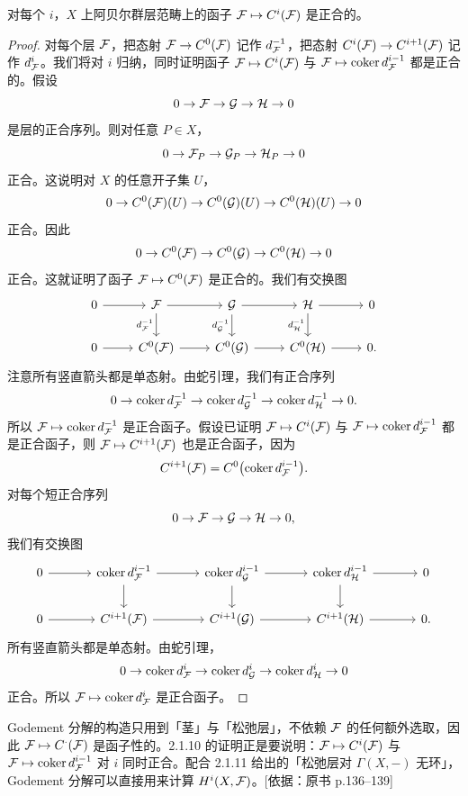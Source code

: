 \begin{proposition}\label{it:2.1.10}
对每个 $i$，$X$ 上阿贝尔群层范畴上的函子 $\mathcal{F}\mapsto C^i(\mathcal{F})$ 是正合的。
\end{proposition}
\begin{proof}
对每个层 $\mathcal{F}$，把态射 $\mathcal{F}\to C^0(\mathcal{F})$ 记作 $d_{\mathcal{F}}^{-1}$，把态射 $C^i(\mathcal{F})\to C^{i+1}(\mathcal{F})$ 记作 $d_{\mathcal{F}}^i$。我们将对 $i$ 归纳，同时证明函子 $\mathcal{F}\mapsto C^i(\mathcal{F})$ 与 $\mathcal{F}\mapsto\operatorname{coker} d_{\mathcal{F}}^{i-1}$ 都是正合的。假设
\[
0\to\mathcal{F}\to\mathcal{G}\to\mathcal{H}\to 0
\]
是层的正合序列。则对任意 $P\in X$，
\[
0\to\mathcal{F}_P\to\mathcal{G}_P\to\mathcal{H}_P\to 0
\]
正合。这说明对 $X$ 的任意开子集 $U$，
\[
0\to C^0(\mathcal{F})(U)\to C^0(\mathcal{G})(U)\to C^0(\mathcal{H})(U)\to 0
\]
正合。因此
\[
0\to C^0(\mathcal{F})\to C^0(\mathcal{G})\to C^0(\mathcal{H})\to 0
\]
正合。这就证明了函子 $\mathcal{F}\mapsto C^0(\mathcal{F})$ 是正合的。我们有交换图
\[\begin{tikzcd}[column sep=2.4em,row sep=1.8em]
0 \arrow[r] & \cF \arrow[r] \arrow[d,"d_{\cF}^{-1}"'] & \cG \arrow[r] \arrow[d,"d_{\cG}^{-1}"'] & \cH \arrow[r] \arrow[d,"d_{\cH}^{-1}"'] & 0 \\
0 \arrow[r] & C^0(\cF) \arrow[r] & C^0(\cG) \arrow[r] & C^0(\cH) \arrow[r] & 0.
\end{tikzcd}\]
注意所有竖直箭头都是单态射。由蛇引理，我们有正合序列
\[
0\to\operatorname{coker} d_{\mathcal{F}}^{-1}\to\operatorname{coker} d_{\mathcal{G}}^{-1}\to\operatorname{coker} d_{\mathcal{H}}^{-1}\to 0.
\]
所以 $\mathcal{F}\mapsto\operatorname{coker} d_{\mathcal{F}}^{-1}$ 是正合函子。假设已证明 $\mathcal{F}\mapsto C^i(\mathcal{F})$ 与 $\mathcal{F}\mapsto\operatorname{coker} d_{\mathcal{F}}^{i-1}$ 都是正合函子，则 $\mathcal{F}\mapsto C^{i+1}(\mathcal{F})$ 也是正合函子，因为
\[
C^{i+1}(\mathcal{F})=C^0\bigl(\operatorname{coker} d_{\mathcal{F}}^{i-1}\bigr).
\]
对每个短正合序列
\[
0\to\mathcal{F}\to\mathcal{G}\to\mathcal{H}\to 0,
\]
我们有交换图
\[\begin{tikzcd}[column sep=3.4em,row sep=1.8em]
0 \arrow[r] & \coker d_{\cF}^{i-1} \arrow[r] \arrow[d] & \coker d_{\cG}^{i-1} \arrow[r] \arrow[d] & \coker d_{\cH}^{i-1} \arrow[r] \arrow[d] & 0 \\
0 \arrow[r] & C^{i+1}(\cF) \arrow[r] & C^{i+1}(\cG) \arrow[r] & C^{i+1}(\cH) \arrow[r] & 0.
\end{tikzcd}\]
所有竖直箭头都是单态射。由蛇引理，
\[
0\to\operatorname{coker} d_{\mathcal{F}}^i\to\operatorname{coker} d_{\mathcal{G}}^i\to\operatorname{coker} d_{\mathcal{H}}^i\to 0
\]
正合。所以 $\mathcal{F}\mapsto\operatorname{coker} d_{\mathcal{F}}^i$ 是正合函子。
\end{proof}
\begin{tnote}
Godement 分解的构造只用到「茎」与「松弛层」，不依赖 $\mathcal{F}$ 的任何额外选取，因此 $\mathcal{F}\mapsto C^\cdot(\mathcal{F})$ 是函子性的。2.1.10 的证明正是要说明：$\mathcal{F}\mapsto C^i(\mathcal{F})$ 与 $\mathcal{F}\mapsto\operatorname{coker} d_{\mathcal{F}}^{i-1}$ 对 $i$ 同时正合。配合 2.1.11 给出的「松弛层对 $\Gamma(X,-)$ 无环」，Godement 分解可以直接用来计算 $H^i(X,\mathcal{F})$。[依据：原书 p.136--139]
\end{tnote}

